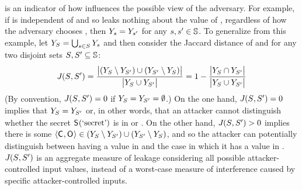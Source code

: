 \possibleDoubles{\secretVal} is an indicator of how \secretVal
influences the possible view of the adversary. For example, if
\AOOFn{} is independent of \secretVar and so leaks nothing about the
value of \secretVar, regardless of how the adversary chooses \ACIFn{},
then $Y_{s} = Y_{s'}$
for any $s, s' \in \mathbb{S}$.  To generalize
from this example, let $Y_{S_{}} =
\bigcup_{s \in S_{}} Y_{s}$
and then consider the Jaccard distance of
\possibleDoubles{\secretsSet{}} and \possibleDoubles{\secretsSetAlt{}}
for any two disjoint sets $S_{}, S_{}' \subseteq
\mathbb{S}$:
\begin{align}
J_{}(S_{}, S_{}')
= \frac{\left|{(Y_{S_{}} \setminus Y_{S_{}'}) \cup (Y_{S_{}'} \setminus Y_{S_{}})}\right|}{\left|{Y_{S_{}} \cup Y_{S_{}'}}\right|}
= 1 - \frac{\left|{Y_{S_{}} \cap Y_{S_{}'}}\right|}{\left|{Y_{S_{}} \cup Y_{S_{}'}}\right|}
	\label{eq:oneJaccard}
\end{align}
(By convention, $J_{}(S_{}, S_{}') = 0$ if
$Y_{S_{}} = Y_{S_{}'}
= \emptyset$.)  On the one hand, $J_{}(S_{},
S_{}') = 0$ implies that $Y_{S_{}} =
Y_{S_{}'}$ or, in other words, that an
attacker cannot distinguish whether the secret $\mathsf{S}_{}(\textrm{`secret'})$
is in \secretsSet{} or \secretsSetAlt{}.  On the other hand,
$J_{}(S_{}, S_{}') > 0$ implies there is
some $\langle\mathsf{C}_{}, \mathsf{O}_{}\rangle \in
(Y_{S_{}} \setminus
Y_{S_{}'}) \cup
(Y_{S_{}'} \setminus
Y_{S_{}})$, and so the attacker can potentially
distinguish between \secretVar having a value in \secretsSet{} and the
case in which it has a value in \secretsSetAlt{}.
$J_{}(S_{}, S_{}')$ is an aggregate measure
  of leakage considering all possible attacker-controlled input values,
  instead of a worst-case measure of interference caused by specific
  attacker-controlled inputs.

